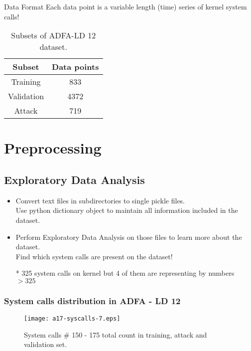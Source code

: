 \documentclass{beamer}
\begin{document}
\begin{frame}{Data Format}
Each data point is a variable length (time) series of kernel system calls!

\begin{table}
\begin{tabular}{|c|c|}
\hline
Subset &  Data points \\ \hline 
Training  & 833 \\ \hline
Validation & 4372 \\ \hline
Attack &  719\\ \hline
\end{tabular}
\vspace{5pt}
\caption{Subsets of ADFA-LD 12 dataset.}
\label{tab3}
\end{table}

\end{frame}




\section{Preprocessing}
\subsection{Exploratory Data Analysis}

\begin{frame}
\begin{itemize}
\item Convert text files in subdirectories to single pickle files.\\
		Use python dictionary object to maintain all information included in the dataset.
\item Perform Exploratory Data Analysis on those files to learn more about the dataset.\\
Find which system calls are present on the dataset!\\
\item[*] 325 system calls on kernel but 4 of them are representing by numbers $> 325$
\end{itemize}

\end{frame}


\frame
{
\frametitle{System calls distribution in ADFA - LD 12}
\vspace{-9pt}
\begin{figure}
\texttt{[image: a17-syscalls-7.eps]}
\caption{System calls \# 150 - 175 total count in training, attack and validation set.}
\end{figure}
}
\end{document}
